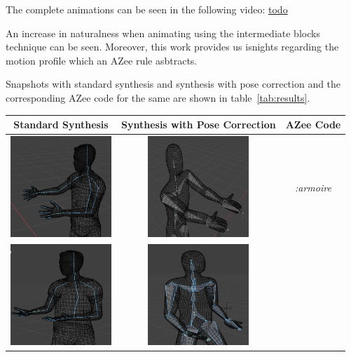 \documentclass[../../main.tex]{subfiles}
\begin{document}
The complete animations can be seen in the following video: \url{todo}

An increase in naturalness when animating using the intermediate blocks technique can be seen. Moreover, this work provides us isnights regarding the motion profile which an AZee rule asbtracts.

Snapshots with standard synthesis and synthesis with pose correction and the corresponding AZee code for the same are shown in table~\ref{tab:results}.

\begin{table}
  \centering
  \begin{tabular}{|c|c|c|}
    \hline
    \textbf{Standard Synthesis} & \textbf{Synthesis with Pose Correction} & \textbf{AZee Code} \\
    \hline
    \includegraphics[width = 1.5in]{chapters/pose_correction/images/standard_synthesis_armoire.png} & \includegraphics[width = 1.5in]{chapters/pose_correction/images/pose_correction_synthesis_armoire.png} & 
      \emph{:armoire} \\
    \hline
    \includegraphics[width = 1.5in]{chapters/pose_correction/images/standard_synthesis_maintenant.png} & \includegraphics[width = 1.5in]{chapters/pose_correction/images/pose_correction_synthesis_maintenant.png} &

\end{tabular}
\end{table}
\end{document}
